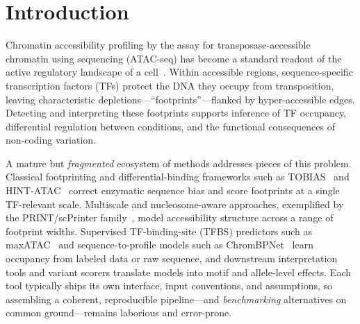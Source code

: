 \documentclass[biomedinformatics,article,submit,pdftex,moreauthors]{Definitions/mdpi}
\begin{document}
\section{Introduction}

Chromatin accessibility profiling by the assay for transposase-accessible
chromatin using sequencing (ATAC-seq) has become a standard readout of the active
regulatory landscape of a cell~\cite{buenrostro2013}. Within accessible regions,
sequence-specific transcription factors (TFs) protect the DNA they occupy from
transposition, leaving characteristic depletions---``footprints''---flanked by
hyper-accessible edges. Detecting and interpreting these footprints supports
inference of TF occupancy, differential regulation between conditions, and the
functional consequences of non-coding variation.

A mature but \emph{fragmented} ecosystem of methods addresses pieces of this
problem. Classical footprinting and differential-binding frameworks such as
TOBIAS~\cite{bentsen2020} and HINT-ATAC~\cite{li2019hint} correct enzymatic
sequence bias and score footprints at a single TF-relevant scale. Multiscale and
nucleosome-aware approaches, exemplified by the PRINT/scPrinter
family~\cite{hu2024print}, model accessibility structure across a range of
footprint widths. Supervised TF-binding-site (TFBS) predictors such as
maxATAC~\cite{cazares2023maxatac} and sequence-to-profile models such as
ChromBPNet~\cite{chrombpnet2024} learn occupancy from labeled data or raw
sequence, and downstream interpretation tools and variant scorers translate models
into motif and allele-level effects. Each tool typically ships its own interface,
input conventions, and assumptions, so assembling a coherent, reproducible
pipeline---and \emph{benchmarking} alternatives on common ground---remains
laborious and error-prone.
\end{document}
